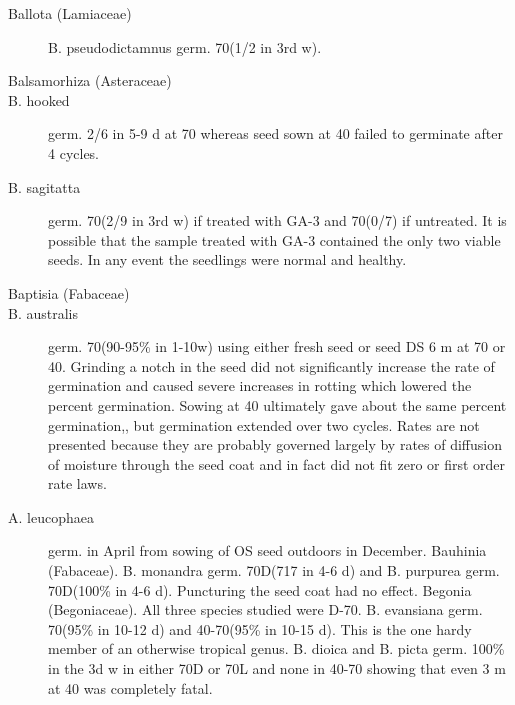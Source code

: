 \begin{description}

\item[Ballota (Lamiaceae)] B. pseudodictamnus germ. 70(1/2 in 3rd w).
\item[Balsamorhiza (Asteraceae)]
\item[B. hooked] germ. 2/6 in 5-9 d at 70 whereas seed sown at 40 failed to germinate
after 4 cycles.
\item[B. sagitatta] germ. 70(2/9 in 3rd w) if treated with GA-3 and 70(0/7) if untreated.
It is possible that the sample treated with GA-3 contained the only two viable seeds. In
any event the seedlings were normal and healthy.

\item[Baptisia (Fabaceae)]
\item[B. australis] germ. 70(90-95\% in 1-10w) using either fresh seed or seed DS 6 m
at 70 or 40. Grinding a notch in the seed did not significantly increase the rate of
germination and caused severe increases in rotting which lowered the percent
germination. Sowing at 40 ultimately gave about the same percent germination,, but
germination extended over two cycles. Rates are not presented because they are
probably governed largely by rates of diffusion of moisture through the seed coat and
in fact did not fit zero or first order rate laws.
\item[A. leucophaea] germ. in April from sowing of OS seed outdoors in December.
Bauhinia (Fabaceae). B. monandra germ. 70D(717 in 4-6 d) and B.
purpurea germ. 70D(100\% in 4-6 d). Puncturing the seed coat had no effect.
Begonia (Begoniaceae). All three species studied were D-70. B.
evansiana germ. 70(95\% in 10-12 d) and 40-70(95\% in 10-15 d). This is the one
hardy member of an otherwise tropical genus. B. dioica and B. picta germ. 100\% in
the 3d w in either 70D or 70L and none in 40-70 showing that even 3 m at 40 was
completely fatal.


\end{description}
